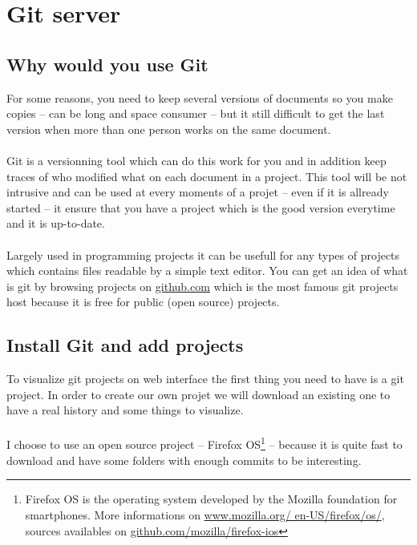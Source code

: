 \chapter{Git server}
\section{Why would you use Git}
For some reasons, you need to keep several versions of documents so you make 
copies -- can be long and space consumer -- but it still difficult to get the 
last version when more than one person works on the same document.
\\\\
Git is a versionning tool which can do this work for you and in addition keep 
traces of who modified what on each document in a project. This tool will be not  
intrusive and can be used at every moments of a projet -- even if it is allready 
started -- it ensure that you have a project which is the \og{}good version\fg{} 
everytime and it is up-to-date.
\\\\
Largely used in programming projects it can be usefull for any types of projects 
which contains files readable by a simple text editor. You can get an idea of what 
is git by browsing projects on \href{http://github.com}{github.com} which is the 
most famous git projects host because it is free for public (open source) projects.

\section{Install Git and add projects}
To visualize git projects on web interface the first thing you need to have is a 
git project. In order to create our own projet we will download an existing one 
to have a real history and some things to visualize. 
\\\\
I choose to use an open source project -- Firefox OS\footnote{Firefox OS is the 
operating system developed by the Mozilla foundation for smartphones. More 
informations on \href{https://www.mozilla.org/en-US/firefox/os/}{www.mozilla.org/
en-US/firefox/os/}, sources availables on \href{https://github.com/mozilla/
firefox-ios}{github.com/mozilla/firefox-ios}} -- because it is quite fast to 
download and have some folders with enough commits to be interesting.

